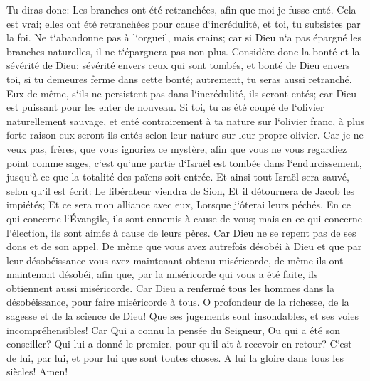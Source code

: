 \verse Tu diras donc: Les branches ont été retranchées, afin que moi je fusse enté. 
\verse Cela est vrai; elles ont été retranchées pour cause d`incrédulité, et toi, tu subsistes par la foi. Ne t`abandonne pas à l`orgueil, mais crains; 
\verse car si Dieu n`a pas épargné les branches naturelles, il ne t`épargnera pas non plus. 
\verse Considère donc la bonté et la sévérité de Dieu: sévérité envers ceux qui sont tombés, et bonté de Dieu envers toi, si tu demeures ferme dans cette bonté; autrement, tu seras aussi retranché. 
\verse Eux de même, s`ils ne persistent pas dans l`incrédulité, ils seront entés; car Dieu est puissant pour les enter de nouveau. 
\verse Si toi, tu as été coupé de l`olivier naturellement sauvage, et enté contrairement à ta nature sur l`olivier franc, à plus forte raison eux seront-ils entés selon leur nature sur leur propre olivier. 
\verse Car je ne veux pas, frères, que vous ignoriez ce mystère, afin que vous ne vous regardiez point comme sages, c`est qu`une partie d`Israël est tombée dans l`endurcissement, jusqu`à ce que la totalité des païens soit entrée. 
\verse Et ainsi tout Israël sera sauvé, selon qu`il est écrit: Le libérateur viendra de Sion, Et il détournera de Jacob les impiétés; 
\verse Et ce sera mon alliance avec eux, Lorsque j`ôterai leurs péchés. 
\verse En ce qui concerne l`Évangile, ils sont ennemis à cause de vous; mais en ce qui concerne l`élection, ils sont aimés à cause de leurs pères. 
\verse Car Dieu ne se repent pas de ses dons et de son appel. 
\verse De même que vous avez autrefois désobéi à Dieu et que par leur désobéissance vous avez maintenant obtenu miséricorde, 
\verse de même ils ont maintenant désobéi, afin que, par la miséricorde qui vous a été faite, ils obtiennent aussi miséricorde. 
\verse Car Dieu a renfermé tous les hommes dans la désobéissance, pour faire miséricorde à tous. 
\verse O profondeur de la richesse, de la sagesse et de la science de Dieu! Que ses jugements sont insondables, et ses voies incompréhensibles! Car 
\verse Qui a connu la pensée du Seigneur, Ou qui a été son conseiller? 
\verse Qui lui a donné le premier, pour qu`il ait à recevoir en retour? 
\verse C`est de lui, par lui, et pour lui que sont toutes choses. A lui la gloire dans tous les siècles! Amen! 

